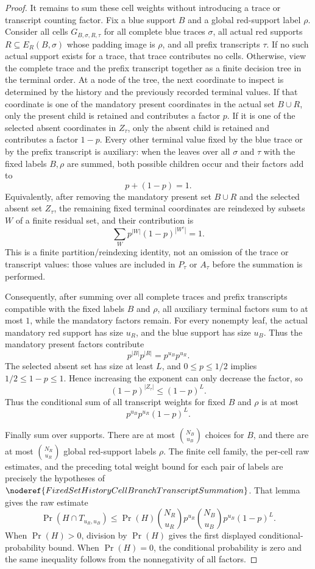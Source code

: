 \begin{proof}
It remains to sum these cell weights without introducing a trace or
transcript counting factor.  Fix a blue support \(B\) and a global
red-support label \(\rho\).  Consider all cells
\(G_{B,\sigma,R,\tau}\) for all complete blue traces \(\sigma\), all actual
red supports \(R\subseteq E_R(B,\sigma)\) whose padding image is \(\rho\),
and all prefix transcripts \(\tau\).  If no such actual support exists for a
trace, that trace contributes no cells.  Otherwise, view the complete trace
and the prefix transcript together as a finite decision tree in the terminal
order.  At a node of the tree, the next coordinate to inspect is determined
by the history and the previously recorded terminal values.  If that
coordinate is one of the mandatory present coordinates in the actual set
\(B\cup R\), only the present child is retained and contributes a factor
\(p\).  If it is one of the selected absent coordinates in \(Z_\tau\), only
the absent child is retained and contributes a factor \(1-p\).  Every other
terminal value fixed by the blue trace or by the prefix transcript is
auxiliary: when the leaves over all \(\sigma\) and \(\tau\) with the fixed
labels \(B,\rho\) are summed, both possible children occur and their factors
add to
\[
p+(1-p)=1.
\]
Equivalently, after removing the mandatory present set \(B\cup R\) and the
selected absent set \(Z_\tau\), the remaining fixed terminal coordinates are
reindexed by subsets \(W\) of a finite residual set, and their contribution is
\[
\sum_W p^{|W|}(1-p)^{|W^c|}=1.
\]
This is a finite partition/reindexing identity, not an omission of the trace
or transcript values: those values are included in \(P_\tau\) or \(A_\tau\)
before the summation is performed.

Consequently, after summing over all complete traces and prefix transcripts
compatible with the fixed labels \(B\) and \(\rho\), all auxiliary terminal
factors sum to at most \(1\), while the mandatory factors remain.  For every
nonempty leaf, the actual mandatory red support has size \(u_R\), and the
blue support has size \(u_B\).  Thus the mandatory present factors contribute
\[
p^{|B|}p^{|R|}=p^{u_B}p^{u_R}.
\]
The selected absent set has size at least \(L\), and \(0\le p\le 1/2\) implies
\(1/2\le 1-p\le1\).  Hence increasing the exponent can only decrease the
factor, so
\[
(1-p)^{|Z_\tau|}\le (1-p)^L.
\]
Thus the conditional sum of all transcript weights for fixed \(B\) and
\(\rho\)
is at most
\[
p^{u_B}p^{u_R}(1-p)^L.
\]

Finally sum over supports.  There are at most \(\binom{N_B}{u_B}\) choices
for \(B\), and there are at most \(\binom{N_R}{u_R}\) global red-support
labels \(\rho\).  The finite cell family, the per-cell raw estimates, and the
preceding total weight bound for each pair of labels are precisely the
hypotheses of
\(\noderef{FixedSetHistoryCellBranchTranscriptSummation}\).  That lemma gives
the raw estimate
\[
\Pr(H\cap T_{u_R,u_B})
\le
\Pr(H)\binom{N_R}{u_R}p^{u_R}\binom{N_B}{u_B}p^{u_B}(1-p)^L.
\]
When \(\Pr(H)>0\), division by \(\Pr(H)\) gives the first displayed
conditional-probability bound.  When \(\Pr(H)=0\), the conditional probability
is zero and the same inequality follows from the nonnegativity of all factors.


\end{proof}
